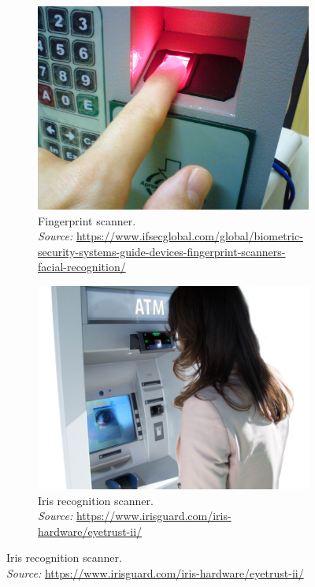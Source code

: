 \documentclass[12pt]{report}
\begin{document}
\begin{figure}[htbp]
    \centering
    \begin{subfigure}[t]{0.45\textwidth}
        \centering
        \includegraphics[width=\linewidth]{Images/Theory/Fingerprint_scanner_identification.jpg}
        \captionsetup{justification=raggedright, singlelinecheck=false, font=small}
        \caption{Fingerprint scanner.\\
        \textit{Source:} \url{https://www.ifsecglobal.com/global/biometric-security-systems-guide-devices-fingerprint-scanners-facial-recognition/}}
        \label{fig:scanner_fingerprint}
    \end{subfigure}
    \hfill
    \begin{subfigure}[t]{0.45\textwidth}
        \centering
        \includegraphics[width=\linewidth]{Images/Theory/eye.png}
        \captionsetup{justification=raggedright, singlelinecheck=false, font=small}
        \caption{Iris recognition scanner.\\
        \textit{Source:} \url{https://www.irisguard.com/iris-hardware/eyetrust-ii/}}
        \label{fig:scanner_eye}
    \end{subfigure}


\end{figure}
\end{document}
